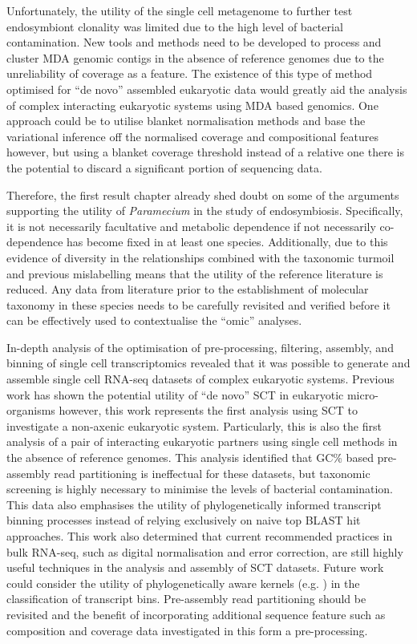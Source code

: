 Unfortunately, the utility of the single cell metagenome to further
test endosymbiont clonality was limited due to 
the high level of bacterial contamination.
New tools and methods need to be developed to process and cluster
MDA genomic contigs in the absence of reference genomes
due to the unreliability of coverage as a feature.  The existence
of this type of method optimised for ``de novo'' assembled eukaryotic data
would greatly aid the analysis of complex interacting eukaryotic
systems using MDA based genomics.   One approach could be to utilise
blanket normalisation methods and base the variational inference
off the normalised coverage and compositional features however,
but using a blanket coverage threshold instead of a relative one
there is the potential to discard a significant portion of sequencing
data.

Therefore, the first result chapter already
shed doubt on some of the arguments supporting the utility of
\textit{Paramecium} in the study of endosymbiosis. Specifically,
it is not necessarily facultative and metabolic dependence if not
necessarily co-dependence has become fixed in at least one
species.  Additionally, due to this evidence of diversity
in the relationships combined with the taxonomic turmoil and previous
mislabelling means that the utility of the reference literature
is reduced. Any data from literature prior to the establishment
of molecular taxonomy in these species needs to be carefully
revisited and verified before it can be effectively used to
contextualise the ``omic'' analyses.


In-depth analysis of the optimisation of pre-processing,
filtering, assembly, and binning of single cell transcriptomics
revealed that it was possible to generate and assemble
single cell RNA-seq datasets of complex eukaryotic
systems. Previous work has shown the potential utility
of ``de novo'' SCT in eukaryotic micro-organisms \citep{Kolisko2014}
however, this work represents the first analysis
using SCT to investigate a non-axenic eukaryotic system.
Particularly, this is also the first analysis of a pair
of interacting eukaryotic partners using single cell methods
in the absence of reference genomes. 
This analysis identified that GC\% based pre-assembly read partitioning
is ineffectual for these datasets, but taxonomic screening
is highly necessary to minimise the levels of bacterial contamination.
This data also emphasises the utility of phylogenetically
informed transcript binning processes instead of relying
exclusively on naive top BLAST hit approaches. 
This work also determined that current recommended practices
 in bulk RNA-seq, such as digital normalisation and error correction,
 are still highly useful techniques in the analysis and assembly
 of SCT datasets.
Future work could consider the utility of phylogenetically aware
kernels (e.g. \citep{Vert2002}) in the classification
of transcript bins. Pre-assembly read partitioning
should be revisited and the benefit of incorporating
additional sequence feature such as composition
and coverage data investigated in this form a pre-processing.


